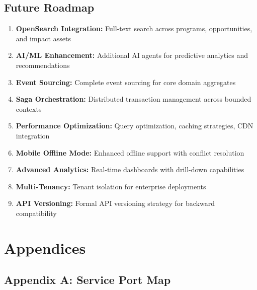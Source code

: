 \subsection{Future Roadmap}

\begin{enumerate}
  \item \textbf{OpenSearch Integration:} Full-text search across programs, opportunities, and impact assets
  \item \textbf{AI/ML Enhancement:} Additional AI agents for predictive analytics and recommendations
  \item \textbf{Event Sourcing:} Complete event sourcing for core domain aggregates
  \item \textbf{Saga Orchestration:} Distributed transaction management across bounded contexts
  \item \textbf{Performance Optimization:} Query optimization, caching strategies, CDN integration
  \item \textbf{Mobile Offline Mode:} Enhanced offline support with conflict resolution
  \item \textbf{Advanced Analytics:} Real-time dashboards with drill-down capabilities
  \item \textbf{Multi-Tenancy:} Tenant isolation for enterprise deployments
  \item \textbf{API Versioning:} Formal API versioning strategy for backward compatibility
\end{enumerate}

\clearpage

\section{Appendices}

\subsection{Appendix A: Service Port Map}

